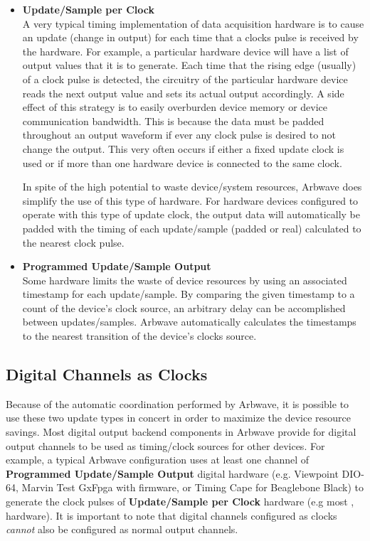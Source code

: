 \begin{itemize}
\item \textbf{Update/Sample per Clock}\\
  A very typical timing implementation of data acquisition hardware is to cause
  an update (change in output) for each time that a clocks pulse is received by
  the hardware.  For example, a particular hardware device will have a list of
  output values that it is to generate.  Each time that the rising edge
  (usually) of a clock pulse is detected, the circuitry of the particular
  hardware device reads the next output value and sets its actual output
  accordingly.  A side effect of this strategy is to easily overburden device
  memory or device communication bandwidth.  This is because the data must be
  padded throughout an output waveform if ever any clock pulse is desired to not
  change the output.  This very often occurs if either a fixed update clock is
  used or if more than one hardware device is connected to the same clock.

  In spite of the high potential to waste device/system resources, Arbwave does
  simplify the use of this type of hardware.  For hardware devices configured to
  operate with this type of update clock, the output data will automatically be
  padded with the timing of each update/sample (padded or real) calculated to
  the nearest clock pulse.

\item \textbf{Programmed Update/Sample Output}\\
  Some hardware limits the waste of device resources by using an associated
  timestamp for each update/sample.  By comparing the given timestamp to a count
  of the device's clock source, an arbitrary delay can be accomplished between
  updates/samples.  Arbwave automatically calculates the timestamps to the
  nearest transition of the device's clocks source.
\end{itemize}

\subsection{Digital Channels as Clocks}
Because of the automatic coordination performed by Arbwave, it is possible to
use these two update types in concert in order to maximize the device resource
savings.  Most digital output backend components in Arbwave provide for digital
output channels to be used as timing/clock sources for other devices.
For example, a typical Arbwave configuration uses at least one channel
of \textbf{Programmed Update/Sample Output} digital hardware (e.g. Viewpoint
DIO-64, Marvin Test GxFpga with  firmware, or  Timing Cape
for Beaglebone Black) to generate the clock pulses of
\textbf{Update/Sample per Clock} hardware (e.g most , 
hardware).  It is important to note that digital channels configured as clocks
\textit{cannot} also be configured as normal output channels.

